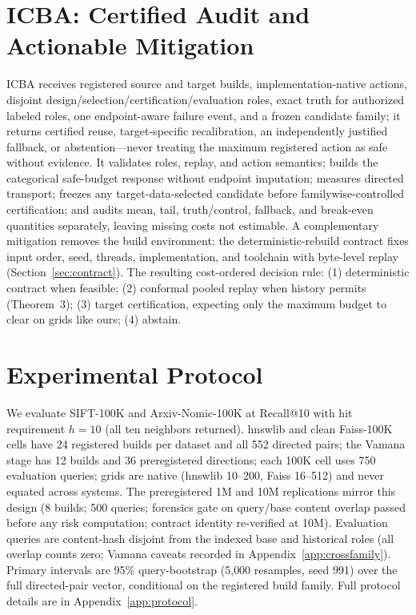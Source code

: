\documentclass{article}
\begin{document}
\section{ICBA: Certified Audit and Actionable Mitigation}
\label{sec:icba}

ICBA receives registered source and target builds, implementation-native actions, disjoint
design/selection/certification/evaluation roles, exact truth for authorized labeled roles, one
endpoint-aware failure event, and a frozen candidate family; it returns certified reuse, target-specific
recalibration, an independently justified fallback, or abstention---never treating the maximum registered
action as safe without evidence. It validates roles, replay, and action semantics; builds the categorical
safe-budget response without endpoint imputation; measures directed transport; freezes any
target-data-selected candidate before familywise-controlled certification; and audits mean, tail,
truth/control, fallback, and break-even quantities separately, leaving missing costs not estimable. A
complementary mitigation removes the build environment: the deterministic-rebuild contract fixes input
order, seed, threads, implementation, and toolchain with byte-level replay (Section~\ref{sec:contract}).
The resulting cost-ordered decision rule: (1) deterministic contract when feasible; (2) conformal pooled
replay when history permits (Theorem~3); (3) target certification, expecting only the maximum budget to
clear on grids like ours; (4) abstain.

\section{Experimental Protocol}
\label{sec:protocol}

We evaluate SIFT-100K and Arxiv-Nomic-100K at Recall@10 with hit requirement $h{=}10$ (all ten
neighbors returned). hnswlib and clean Faiss-100K cells have 24 registered builds per dataset and all 552
directed pairs; the Vamana stage has 12 builds and 36 preregistered directions; each 100K cell uses 750
evaluation queries; grids are native (hnswlib 10--200, Faiss 16--512) and never equated across systems.
The preregistered 1M and 10M replications mirror this design (8 builds; 500 queries; forensics gate on
query/base content overlap passed before any risk computation; contract identity re-verified at 10M).
Evaluation queries are content-hash disjoint from the indexed base and historical roles (all overlap
counts zero; Vamana caveats recorded in Appendix~\ref{app:crossfamily}). Primary intervals are 95\%
query-bootstrap (5{,}000 resamples, seed 991) over the full directed-pair vector, conditional on the
registered build family. Full protocol details are in Appendix~\ref{app:protocol}.
\end{document}
